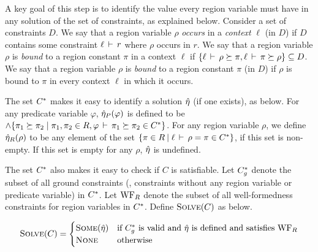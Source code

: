 A key goal of this step is to identify the value every region variable must
have in any solution of the set of constraints, as explained below.
%
%
Consider a set of constraints $D$. We say that a region variable $\rho$
\emph{occurs} in a \emph{context} $\ell$ (in $D$) if $D$ contains some
constraint $\ell\,\vdash\,r$ where $\rho$ occurs in $r$.
We say that a region variable $\rho$ is \emph{bound} to a region constant
$\pi$ in a context $\ell$ if
$\{ \ell\,\vdash\,\rho \succeq \pi, \ell\,\vdash\,\pi \succeq \rho \} \subseteq D$.
We say that a region variable $\rho$ is \emph{bound} to a region constant $\pi$ (in $D$) if
$\rho$ is bound to $\pi$ in every context $\ell$ in which it occurs.


The set ${C}^*$ makes it easy to identify a solution $\hat{\eta}$ (if one exists), as below.
For any predicate variable $\varphi$, $\hat{\eta}_P(\varphi)$ is defined
to be $\wedge \{ \pi_1 \succeq \pi_2 \;|\; \pi_1, \pi_2 \in R, \varphi\,\vdash\,\pi_1 \succeq \pi_2 \in {C}^* \}$.
For any region variable $\rho$, we define $\hat{\eta}_R(\rho)$ to be any element of the
set $\{ \pi \in R \:|\; \ell\,\vdash\,\rho = \pi \in {C}^* \}$,
if this set is non-empty. If this set is empty for any $\rho$, $\hat{\eta}$ is undefined.

The set ${C}^*$ also makes it easy to check if $C$ is satisfiable.
Let ${C}^*_g$ denote the subset of all ground constraints
(\ie, constraints without any region variable or predicate variable)
in ${C}^*$. Let $\text{WF}_R$ denote the subset of all well-formedness
constraints for region variables in ${C}^*$.
Define $\textsc{Solve}(C)$ as below.

\[
\textsc{Solve}(C) = 
\begin{cases}
\textsc{Some} (\hat{\eta}) & \textrm{if ${C}^*_g$ is valid and $\hat{\eta}$ is defined and satisfies $\text{WF}_R$} \\
\textsc{None} & \textrm{otherwise}
\end{cases}
\]

